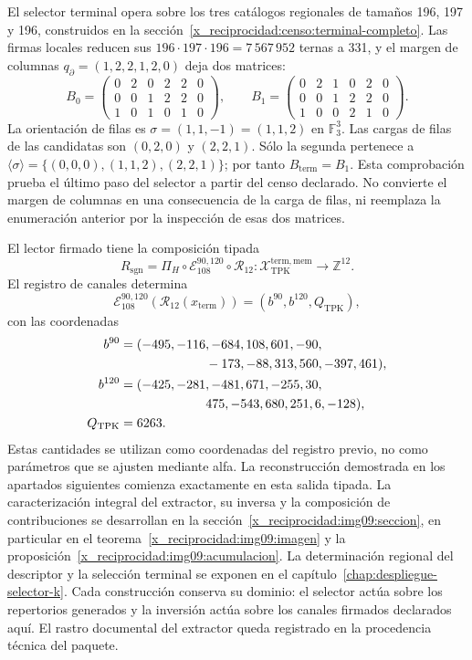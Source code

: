 El selector terminal opera sobre los tres catálogos regionales
de tamaños 196, 197 y 196, construidos en la
sección~\ref{x_reciprocidad:censo:terminal-completo}. Las firmas locales reducen sus
\(196\cdot197\cdot196=7\,567\,952\) ternas a 331, y el margen de
columnas \(q_{\partial}=(1,2,2,1,2,0)\) deja dos matrices:
\[
 B_0=\begin{pmatrix}0&2&0&2&2&0\\0&0&1&2&2&0\\1&0&1&0&1&0\end{pmatrix},
 \qquad
 B_1=\begin{pmatrix}0&2&1&0&2&0\\0&0&1&2&2&0\\1&0&0&2&1&0\end{pmatrix}.
\]
La orientación de filas es \(\sigma=(1,1,-1)=(1,1,2)\) en
\(\mathbb F_3^3\). Las cargas de filas de las candidatas son
\((0,2,0)\) y \((2,2,1)\). Sólo la segunda pertenece a
\(\langle\sigma\rangle=\{(0,0,0),(1,1,2),(2,2,1)\}\); por tanto
\(B_{\mathrm{term}}=B_1\). Esta comprobación prueba el último paso del
selector a partir del censo declarado. No convierte el margen de columnas
en una consecuencia de la carga de filas, ni reemplaza la enumeración
anterior por la inspección de esas dos matrices.

El lector firmado tiene la composición tipada
\begin{equation}
 R_{\mathrm{sgn}}
 =\Pi_H\circ\mathcal E_{108}^{90,120}\circ\mathcal R_{12}:
 \mathcal X_{\mathrm{TPK}}^{\mathrm{term,mem}}
 \longrightarrow\mathbb Z^{12}.
 \label{x_reciprocidad:eq:k-lector-firmado}
\end{equation}
El registro de canales determina
\[
 \mathcal E_{108}^{90,120}(\mathcal R_{12}(x_{\mathrm{term}}))
 =(b^{90},b^{120},Q_{\mathrm{TPK}}),
\]
con las coordenadas
\begin{align*}
 b^{90}={}&(-495,-116,-684,108,601,-90,\\
            &\hspace{19mm}-173,-88,313,560,-397,461),\\
 b^{120}={}&(-425,-281,-481,671,-255,30,\\
             &\hspace{19mm}475,-543,680,251,6,-128),\\
 Q_{\mathrm{TPK}}={}&6263.
\end{align*}
Estas cantidades se utilizan como coordenadas del registro previo, no
como parámetros que se ajusten mediante alfa. La reconstrucción demostrada
en los apartados siguientes comienza exactamente en esta salida tipada.
La caracterización integral del extractor, su inversa y la composición
de contribuciones se desarrollan en la sección~\ref{x_reciprocidad:img09:seccion},
en particular en el teorema~\ref{x_reciprocidad:img09:imagen} y la
proposición~\ref{x_reciprocidad:img09:acumulacion}. La determinación regional
del descriptor y la selección terminal se exponen en el
capítulo~\ref{chap:despliegue-selector-k}. Cada construcción conserva su
dominio: el selector actúa sobre los repertorios generados y la inversión
actúa sobre los canales firmados declarados aquí. El rastro documental del
extractor queda registrado en la procedencia técnica del paquete.

